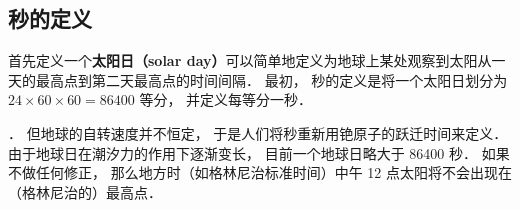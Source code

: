 
\subsection{秒的定义}
首先定义一个\textbf{太阳日（solar day）}可以简单地定义为地球上某处观察到太阳从一天的最高点到第二天最高点的时间间隔． 最初， 秒的定义是将一个太阳日划分为 $24\times60\times60 = 86400$ 等分， 并定义每等分一秒．

 ． 但地球的自转速度并不恒定， 于是人们将秒重新用铯原子的跃迁时间来定义． 由于地球日在潮汐力的作用下逐渐变长， 目前一个地球日略大于 86400 秒． 如果不做任何修正， 那么地方时（如格林尼治标准时间）中午 12 点太阳将不会出现在（格林尼治的）最高点．
